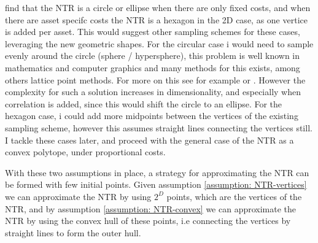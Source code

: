 \documentclass[11pt]{article}
\begin{document}
\autocite{Dybvig2020} find that the \ac{NTR} is a circle or ellipse when there are only fixed costs, and when there are asset specifc costs the \ac{NTR} is a hexagon in the 2D case, as one vertice is added per asset.
This would suggest other sampling schemes for these cases, leveraging the new geometric shapes.
For the circular case i would need to sample evenly around the circle (sphere / hypersphere), this problem is well known in mathematics and computer graphics and many methods for this exists,
among others lattice point methods. For more on this see for example \autocite{UNSWsphere} or \autocite{delbono2024}. However the complexity for such a solution increases in dimensionality, and especially when correlation is added,
since this would shift the circle to an ellipse. For the hexagon case, i could add more midpoints between the vertices of the existing sampling scheme, however this assumes straight lines connecting the vertices still.
I tackle these cases later, and proceed with the general case of the \ac{NTR} as a convex polytope, under proportional costs.


With these two assumptions in place, a strategy for approximating the \ac{NTR} can be formed with few initial points.
Given assumption \ref{assumption: NTR-vertices} we can approximate the \ac{NTR} by using $2^{D}$ points, which are the vertices of the \ac{NTR},
and by assumption \ref{assumption: NTR-convex} we can approximate the \ac{NTR} by using the convex hull of these points, i.e connecting the vertices by straight lines to form the outer hull.
\end{document}
